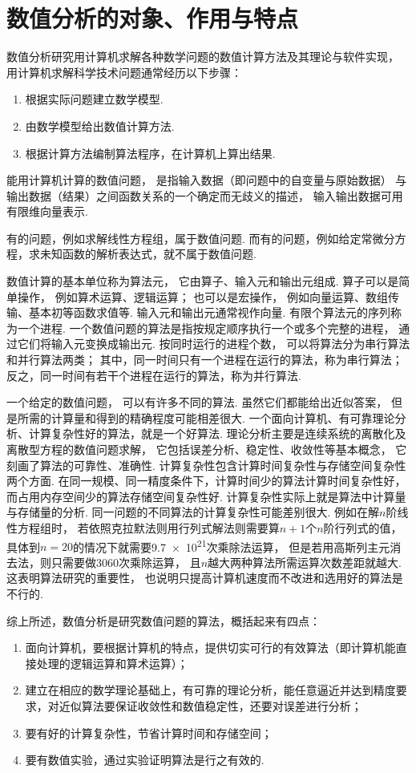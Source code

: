 \section{数值分析的对象、作用与特点}
数值分析研究用计算机求解各种数学问题的数值计算方法及其理论与软件实现，
用计算机求解科学技术问题通常经历以下步骤：
\begin{enumerate}
	\item 根据实际问题建立数学模型.
	\item 由数学模型给出数值计算方法.
	\item 根据计算方法编制算法程序，在计算机上算出结果.
\end{enumerate}

能用计算机计算的数值问题，
是指输入数据（即问题中的自变量与原始数据）
与输出数据（结果）之间函数关系的一个确定而无歧义的描述，
输入输出数据可用有限维向量表示.

有的问题，例如求解线性方程组，属于数值问题.
而有的问题，例如给定常微分方程，求未知函数的解析表达式，就不属于数值问题.

数值计算的基本单位称为算法元，
它由算子、输入元和输出元组成.
算子可以是简单操作，
例如算术运算、逻辑运算；
也可以是宏操作，
例如向量运算、数组传输、基本初等函数求值等.
输入元和输出元通常视作向量.
有限个算法元的序列称为一个进程.
一个数值问题的算法是指按规定顺序执行一个或多个完整的进程，
通过它们将输入元变换成输出元.
按同时运行的进程个数，
可以将算法分为串行算法和并行算法两类；
其中，同一时间只有一个进程在运行的算法，称为串行算法；
反之，同一时间有若干个进程在运行的算法，称为并行算法.

一个给定的数值问题，
可以有许多不同的算法.
虽然它们都能给出近似答案，
但是所需的计算量和得到的精确程度可能相差很大.
一个面向计算机、有可靠理论分析、计算复杂性好的算法，就是一个好算法.
理论分析主要是连续系统的离散化及离散型方程的数值问题求解，
它包括误差分析、稳定性、收敛性等基本概念，
它刻画了算法的可靠性、准确性.
计算复杂性包含计算时间复杂性与存储空间复杂性两个方面.
在同一规模、同一精度条件下，计算时间少的算法计算时间复杂性好，
而占用内存空间少的算法存储空间复杂性好.
计算复杂性实际上就是算法中计算量与存储量的分析.
同一问题的不同算法的计算复杂性可能差别很大.
例如在解\(n\)阶线性方程组时，
若依照克拉默法则用行列式解法则需要算\(n+1\)个\(n\)阶行列式的值，
具体到\(n=20\)的情况下就需要\num{9.7e21}次乘除法运算，
但是若用高斯列主元消去法，则只需要做3060次乘除运算，
且\(n\)越大两种算法所需运算次数差距就越大.
这表明算法研究的重要性，
也说明只提高计算机速度而不改进和选用好的算法是不行的.

综上所述，数值分析是研究数值问题的算法，概括起来有四点：\begin{enumerate}
	\item 面向计算机，要根据计算机的特点，提供切实可行的有效算法（即计算机能直接处理的逻辑运算和算术运算）；
	\item 建立在相应的数学理论基础上，有可靠的理论分析，能任意逼近并达到精度要求，对近似算法要保证收敛性和数值稳定性，还要对误差进行分析；
	\item 要有好的计算复杂性，节省计算时间和存储空间；
	\item 要有数值实验，通过实验证明算法是行之有效的.
\end{enumerate}
